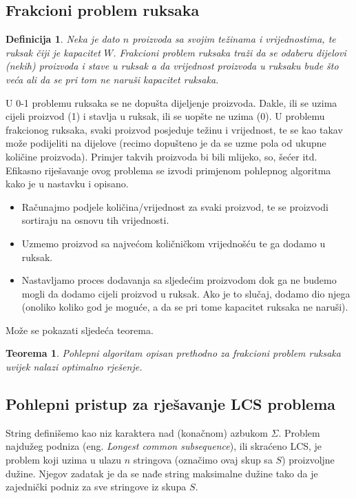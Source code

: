\documentclass[a4paper, utf8, 11pt, colorlinks]{book}
\newtheorem{definition}{Definicija}[chapter]
\newtheorem{thm}{Teorema}[chapter]
\theoremstyle{definition}
\begin{document}
\subsection{Frakcioni problem ruksaka}

\begin{definition}
  Neka je dato $n$ proizvoda sa svojim  težinama i vrijednostima, 
  te ruksak čiji je kapacitet $W$. Frakcioni problem ruksaka traži da se odaberu dijelovi   (nekih) proizvoda i stave u ruksak a da vrijednost proizvoda u ruksaku bude što veća ali da se pri tom ne naruši kapacitet ruksaka.
\end{definition}
U 0-1 problemu ruksaka se ne dopušta dijeljenje proizvoda. Dakle, ili se uzima cijeli proizvod (1) i stavlja u ruksak, ili se uopšte ne uzima (0). U  problemu frakcionog ruksaka, svaki proizvod posjeduje težinu i vrijednost, te se kao takav može podijeliti na dijelove (recimo dopušteno je da se uzme   pola od ukupne količine proizvoda). Primjer takvih proizvoda bi bili mlijeko, so, šećer itd. Efikasno riješavanje ovog problema se izvodi primjenom pohlepnog algoritma kako je u nastavku i opisano.
\begin{itemize}
	\item Računajmo podjele količina/vrijednost za svaki proizvod, te se proizvodi  sortiraju na osnovu tih vrijednosti.   \item Uzmemo proizvod sa najvećom količničkom vrijednošću te ga dodamo u ruksak. 
	\item Nastavljamo proces dodavanja sa sljedećim proizvodom dok ga ne budemo mogli da dodamo cijeli proizvod u ruksak.    Ako je to slučaj, dodamo dio njega (onoliko koliko god je moguće, a da se pri tome kapacitet ruksaka ne naruši). 
\end{itemize}
Može se pokazati sljedeća teorema. 

\begin{thm}
      Pohlepni algoritam opisan prethodno za frakcioni problem ruksaka uvijek nalazi optimalno rješenje.
\end{thm}
\subsection{Pohlepni pristup za rješavanje LCS problema}

String definišemo kao niz karaktera nad (konačnom) azbukom $\Sigma$. 
Problem najdužeg podniza (eng. \emph{Longest common subsequence}), ili skraćeno LCS, je problem koji uzima u ulazu  $n$ stringova (označimo ovaj skup sa $S$) proizvoljne dužine. Njegov zadatak je da se nađe string maksimalne dužine tako da je  zajednički podniz za sve stringove iz skupa $S$. 
\end{document}
